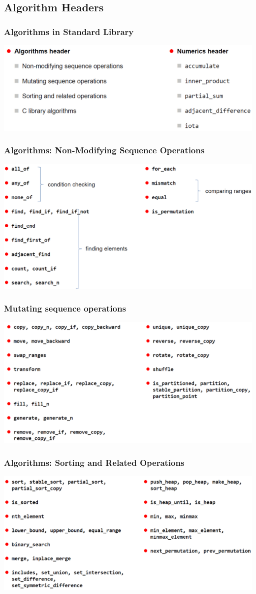\subsection{Algorithm Headers}
\subsubsection{Algorithms in Standard Library}
\includegraphics[scale=0.4]{media/algo_header.png}
\subsubsection{Algorithms: Non-Modifying Sequence Operations}
\includegraphics[scale=0.4]{media/algo1.png}
\subsubsection{Mutating sequence operations}
\includegraphics[scale=0.4]{media/algo2.png}
\subsubsection{Algorithms: Sorting and Related Operations}
\includegraphics[scale=0.4]{media/algo3.png}